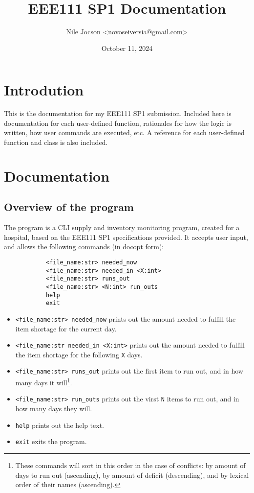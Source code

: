 \documentclass{article}
\title{EEE111 SP1 Documentation}
\author{Nile Jocson \textless{novoseiversia@gmail.com}\textgreater}
\date{October 11, 2024}
\begin{document}
	\maketitle
		\pagebreak



	\tableofcontents
		\pagebreak



	\section{Introdution}
		This is the documentation for my EEE111 SP1 submission. Included here is
		documentation for each user-defined function, rationales for how the logic
		is written, how user commands are executed, etc. A reference for each user-defined
		function and class is also included.
		\newpage



	\section{Documentation}
		\subsection{Overview of the program} \label{overview-of-the-program}
			The program is a CLI supply and inventory monitoring program,
			created for a hospital, based on the EEE111 SP1 specifications
			provided. It accepts user input, and allows the following commands
			(in docopt form):

			\begin{verbatim}
			<file_name:str> needed_now
			<file_name:str> needed_in <X:int>
			<file_name:str> runs_out
			<file_name:str> <N:int> run_outs
			help
			exit
			\end{verbatim}

			\begin{itemize}
				\item \verb|<file_name:str> needed_now| prints out the amount needed to fulfill
			the item shortage for the current day.

				\item \verb|<file_name:str needed_in <X:int>| prints out the amount needed to
				fulfill the item shortage for the following \verb|X| days.

				\item \verb|<file_name:str> runs_out| prints out the first item to run out, and
				in how many days it will\footnote{
					These commands will sort in this order in the case of conflicts:
					by amount of days to run out (ascending),
					by amount of deficit (descending),
					and by lexical order of their names (ascending).
				}.

				\item \verb|<file_name:str> run_outs| prints out the virst \verb|N| items to run
				out, and in how many days they will\footnotemark[\value{footnote}].

				\item \verb|help| prints out the help text.

				\item \verb|exit| exits the program.
			\end{itemize}
\end{document}
